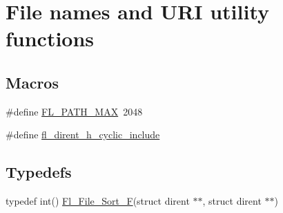 \hypertarget{group__filenames}{}\section{File names and U\+RI utility functions}
\label{group__filenames}
\subsection*{Macros}
\begin{DoxyCompactItemize}
\item 
\#define \hyperlink{group__filenames_ga29253083ed9918c2f9d532bd5ed89cc3}{F\+L\+\_\+\+P\+A\+T\+H\+\_\+\+M\+AX}~2048
\item 
\#define \hyperlink{group__filenames_ga611853809ad3600822556b6c9f5b3232}{fl\+\_\+dirent\+\_\+h\+\_\+cyclic\+\_\+include}
\end{DoxyCompactItemize}
\subsection*{Typedefs}
\begin{DoxyCompactItemize}
\item 
typedef int() \hyperlink{group__filenames_gaaf6f4a54bb593dcf326fc5d12bb1435c}{Fl\+\_\+\+File\+\_\+\+Sort\+\_\+F}(struct dirent $\ast$$\ast$, struct dirent $\ast$$\ast$)
\end{DoxyCompactItemize}
